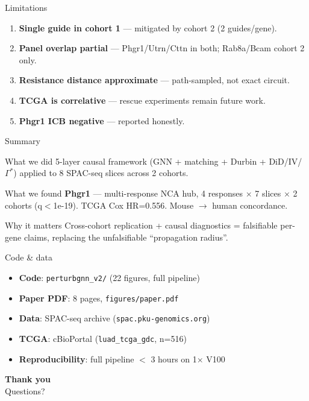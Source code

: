 \documentclass[aspectratio=169]{beamer}
\begin{document}
\begin{frame}{Limitations}
\begin{enumerate}
\item \textbf{Single guide in cohort 1} — mitigated by cohort 2 (2 guides/gene).
\item \textbf{Panel overlap partial} — Phgr1/Utrn/Cttn in both; Rab8a/Bcam cohort 2 only.
\item \textbf{Resistance distance approximate} — path-sampled, not exact circuit.
\item \textbf{TCGA is correlative} — rescue experiments remain future work.
\item \textbf{Phgr1 ICB negative} — reported honestly.
\end{enumerate}
\end{frame}

\begin{frame}{Summary}
\begin{block}{What we did}
5-layer causal framework (GNN + matching + Durbin + DiD/IV/$\Gamma^*$) applied to 8 SPAC-seq slices across 2 cohorts.
\end{block}

\begin{block}{What we found}
\textbf{Phgr1} — multi-response NCA hub, 4 responses $\times$ 7 slices $\times$ 2 cohorts (q$<$1e-19). TCGA Cox HR=0.556. Mouse $\to$ human concordance.
\end{block}

\begin{block}{Why it matters}
Cross-cohort replication + causal diagnostics = falsifiable per-gene claims, replacing the unfalsifiable ``propagation radius''.
\end{block}
\end{frame}

\begin{frame}{Code \& data}
\begin{itemize}
\item \textbf{Code}: \texttt{perturbgnn\_v2/} (22 figures, full pipeline)
\item \textbf{Paper PDF}: 8 pages, \texttt{figures/paper.pdf}
\item \textbf{Data}: SPAC-seq archive (\texttt{spac.pku-genomics.org})
\item \textbf{TCGA}: cBioPortal (\texttt{luad\_tcga\_gdc}, n=516)
\item \textbf{Reproducibility}: full pipeline $<$ 3 hours on 1$\times$ V100
\end{itemize}

\vspace{0.5cm}
\begin{center}
\Large \textbf{Thank you} \\[0.3cm]
\normalsize Questions?
\end{center}
\end{frame}
\end{document}
